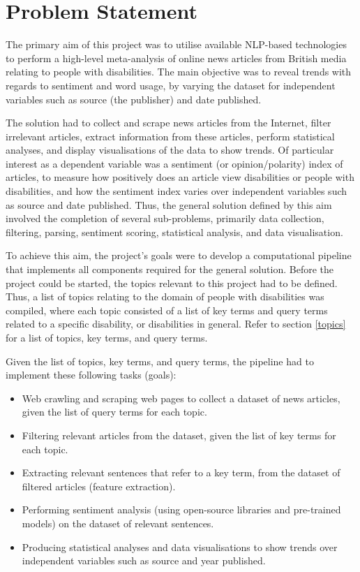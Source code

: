 \documentclass{report}
\begin{document}
\section{Problem Statement} \label{Problem Statement}

The primary aim of this project was to utilise available NLP-based technologies to perform a high-level meta-analysis of online news articles from British media relating to people with disabilities. 
The main objective was to reveal trends with regards to sentiment and word usage, by varying the dataset for independent variables such as source (the publisher) and date published.

The solution had to collect and scrape news articles from the Internet, filter irrelevant articles, extract information from these articles, perform statistical analyses, and display visualisations of the data to show trends.
Of particular interest as a dependent variable was a sentiment (or opinion/polarity) index of articles, to measure how positively does an article view disabilities or people with disabilities, and how the sentiment index varies over independent variables such as source and date published.
Thus, the general solution defined by this aim involved the completion of several sub-problems, primarily data collection, filtering, parsing, sentiment scoring, statistical analysis, and data visualisation.

To achieve this aim, the project's goals were to develop a computational pipeline that implements all components required for the general solution.
Before the project could be started, the topics relevant to this project had to be defined.
Thus, a list of topics relating to the domain of people with disabilities was compiled, where each topic consisted of a list of key terms and query terms related to a specific disability, or disabilities in general.
Refer to section \ref{topics} for a list of topics, key terms, and query terms.

Given the list of topics, key terms, and query terms, the pipeline had to implement these following tasks (goals):
\begin{itemize}
	\item Web crawling and scraping web pages to collect a dataset of news articles, given the list of query terms for each topic.
	\item Filtering relevant articles from the dataset, given the list of key terms for each topic.
	\item Extracting relevant sentences that refer to a key term, from the dataset of filtered articles (feature extraction).
	\item Performing sentiment analysis (using open-source libraries and pre-trained models) on the dataset of relevant sentences.
	\item Producing statistical analyses and data visualisations to show trends over independent variables such as source and year published.
\end{itemize}
\end{document}
